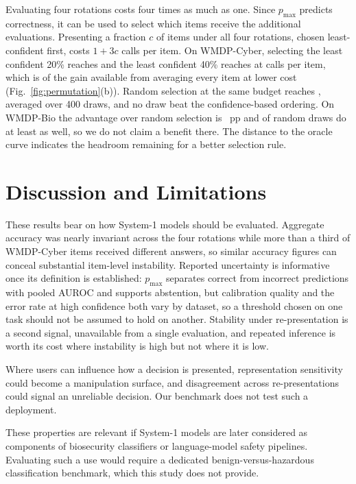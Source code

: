 \documentclass[conference,compsoc]{IEEEtran}
\newcommand{\pmax}{p_{\max}}
\begin{document}
Evaluating four rotations costs four times as much as one. Since $\pmax$ predicts
correctness, it can be used to select which items receive the additional evaluations.
Presenting a fraction $c$ of items under all four rotations, chosen least-confident first,
costs $1 + 3c$ calls per item. On WMDP-Cyber, selecting the least confident 20\% reaches
\statCascadeCyberAtTwenty{} and the least confident 40\% reaches \statCascadeCyberAtForty{}
at \statCascadeCyberCallsForty{} calls per item, which is \statCascadeFracOfGain{} of the
gain available from averaging every item at \statCascadeCostSaving{} lower cost
(Fig.~\ref{fig:permutation}(b)). Random selection at the same budget reaches
\statCascadeCyberRandForty{}, averaged over 400 draws, and no draw beat the confidence-based ordering. On WMDP-Bio the advantage over random selection is
\statCascadeAdvantageBio{}~pp and \statCascadeRandBeatBio{} of random draws do at least as
well, so we do not claim a benefit there. The distance to the oracle curve indicates the
headroom remaining for a better selection rule.

\section{Discussion and Limitations}

These results bear on how System-1 models should be evaluated. Aggregate accuracy was
nearly invariant across the four rotations while more than a third of WMDP-Cyber items
received different answers, so similar accuracy figures can conceal substantial item-level instability. Reported uncertainty is informative once its definition is
established: $\pmax$ separates correct from incorrect predictions with pooled AUROC
\statAurocPooled{} and supports abstention, but calibration quality and the error rate
at high confidence both vary by dataset, so a threshold chosen on one task should not be
assumed to hold on another. Stability under re-presentation is a second signal,
unavailable from a single evaluation, and repeated inference is worth its cost where
instability is high but not where it is low.

Where users can influence how a decision is presented, representation sensitivity could
become a manipulation surface, and disagreement across re-presentations could signal an
unreliable decision. Our benchmark does not test such a deployment.

These properties are relevant if System-1 models are later considered as components of
biosecurity classifiers or language-model safety pipelines. Evaluating such a use would
require a dedicated benign-versus-hazardous classification benchmark, which this study does
not provide.
\end{document}
